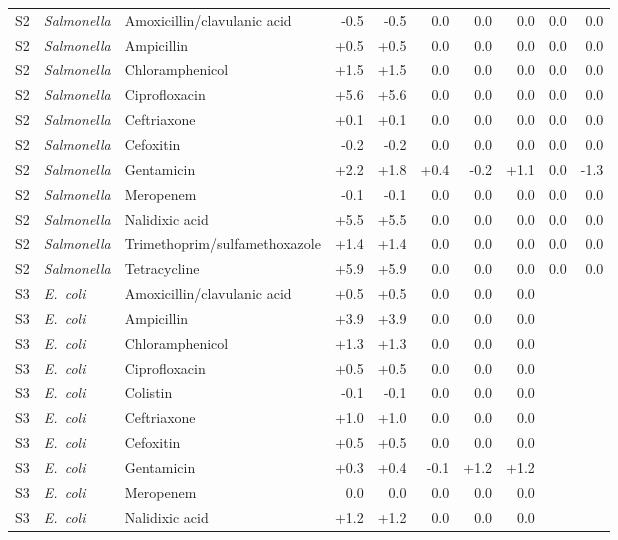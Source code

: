 {\begin{longtable}{lllrrrrrrr}
S2 & \textit{Salmonella} & Amoxicillin/clavulanic acid & -0.5 & -0.5 & 0.0 & 0.0 & 0.0 & 0.0 & 0.0 \\
S2 & \textit{Salmonella} & Ampicillin & +0.5 & +0.5 & 0.0 & 0.0 & 0.0 & 0.0 & 0.0 \\
S2 & \textit{Salmonella} & Chloramphenicol & +1.5 & +1.5 & 0.0 & 0.0 & 0.0 & 0.0 & 0.0 \\
S2 & \textit{Salmonella} & Ciprofloxacin & +5.6 & +5.6 & 0.0 & 0.0 & 0.0 & 0.0 & 0.0 \\
S2 & \textit{Salmonella} & Ceftriaxone & +0.1 & +0.1 & 0.0 & 0.0 & 0.0 & 0.0 & 0.0 \\
S2 & \textit{Salmonella} & Cefoxitin & -0.2 & -0.2 & 0.0 & 0.0 & 0.0 & 0.0 & 0.0 \\
S2 & \textit{Salmonella} & Gentamicin & +2.2 & +1.8 & +0.4 & -0.2 & +1.1 & 0.0 & -1.3 \\
S2 & \textit{Salmonella} & Meropenem & -0.1 & -0.1 & 0.0 & 0.0 & 0.0 & 0.0 & 0.0 \\
S2 & \textit{Salmonella} & Nalidixic acid & +5.5 & +5.5 & 0.0 & 0.0 & 0.0 & 0.0 & 0.0 \\
S2 & \textit{Salmonella} & Trimethoprim/sulfamethoxazole & +1.4 & +1.4 & 0.0 & 0.0 & 0.0 & 0.0 & 0.0 \\
S2 & \textit{Salmonella} & Tetracycline & +5.9 & +5.9 & 0.0 & 0.0 & 0.0 & 0.0 & 0.0 \\
S3 & \textit{E.~coli} & Amoxicillin/clavulanic acid & +0.5 & +0.5 & 0.0 & 0.0 & 0.0 &  &  \\
S3 & \textit{E.~coli} & Ampicillin & +3.9 & +3.9 & 0.0 & 0.0 & 0.0 &  &  \\
S3 & \textit{E.~coli} & Chloramphenicol & +1.3 & +1.3 & 0.0 & 0.0 & 0.0 &  &  \\
S3 & \textit{E.~coli} & Ciprofloxacin & +0.5 & +0.5 & 0.0 & 0.0 & 0.0 &  &  \\
S3 & \textit{E.~coli} & Colistin & -0.1 & -0.1 & 0.0 & 0.0 & 0.0 &  &  \\
S3 & \textit{E.~coli} & Ceftriaxone & +1.0 & +1.0 & 0.0 & 0.0 & 0.0 &  &  \\
S3 & \textit{E.~coli} & Cefoxitin & +0.5 & +0.5 & 0.0 & 0.0 & 0.0 &  &  \\
S3 & \textit{E.~coli} & Gentamicin & +0.3 & +0.4 & -0.1 & +1.2 & +1.2 &  &  \\
S3 & \textit{E.~coli} & Meropenem & 0.0 & 0.0 & 0.0 & 0.0 & 0.0 &  &  \\
S3 & \textit{E.~coli} & Nalidixic acid & +1.2 & +1.2 & 0.0 & 0.0 & 0.0 &  &  \\

\end{longtable}}
